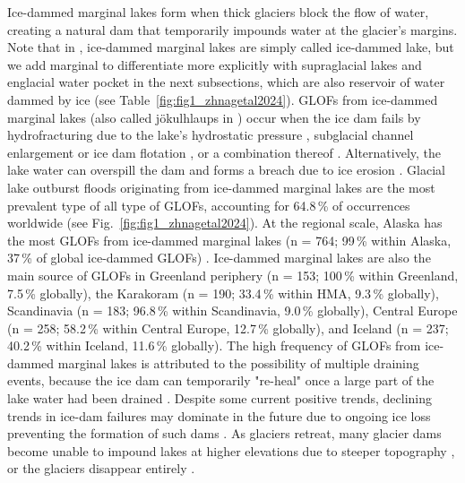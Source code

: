 Ice-dammed marginal lakes form when thick glaciers block the flow of water, creating a natural dam that temporarily impounds water at the glacier's margins. Note that in \cite{Lutzow&al2023,Zhang&al2024}, ice-dammed marginal lakes are simply called ice-dammed lake, but we add marginal to differentiate more explicitly with supraglacial lakes and englacial water pocket in the next subsections, which are also reservoir of water dammed by ice (see Table~\ref{fig:fig1_zhnagetal2024}). GLOFs from ice-dammed marginal lakes (also called jökulhlaups in \cite{Bjornsson2010}) occur when the ice dam fails by hydrofracturing due to the lake's hydrostatic pressure \citep[e.g. in][]{Lindner&al2020}, subglacial channel enlargement \citep{Nye1976} or ice dam flotation \citep[e.g. in][]{Liestol1956}, or a combination thereof \citep{Flowers&al2004}\citep[see also][for a review on the physical aspects of these mechanisms]{Flowers2015}. Alternatively, the lake water can overspill the dam and forms a breach due to ice erosion \citep[e.g.][]{Walder&Costa1996,Raymond&Nolan2000,Mayer&Schuler2005}. Glacial lake outburst floods originating from ice-dammed marginal lakes are the most prevalent type of all type of GLOFs, accounting for 64.8\,\% of occurrences worldwide (see Fig.~\ref{fig:fig1_zhnagetal2024}). At the regional scale, Alaska has the most GLOFs from ice-dammed marginal lakes (n = 764; 99\,\% within Alaska, 37\,\% of global ice-dammed GLOFs) \citep{Emmer&al2022}. Ice-dammed marginal lakes are also the main source of GLOFs in Greenland periphery (n = 153; 100\,\% within Greenland, 7.5\,\% globally), the Karakoram (n = 190; 33.4\,\% within HMA, 9.3\,\% globally), Scandinavia (n = 183; 96.8\,\% within Scandinavia, 9.0\,\% globally), Central Europe (n = 258; 58.2\,\% within Central Europe, 12.7\,\% globally), and Iceland (n = 237; 40.2\,\% within Iceland, 11.6\,\% globally)\citep{Zhang&al2024}. The high frequency of GLOFs from ice-dammed marginal lakes is attributed to the possibility of multiple draining events, because the ice dam can temporarily "re-heal" once a large part of the lake water had been drained \citep{Zhang&al2024}. Despite some current positive trends, declining trends in ice-dam failures may dominate in the future due to ongoing ice loss preventing the formation of such dams \citep{Rick&al2022}. As glaciers retreat, many glacier dams become unable to impound lakes at higher elevations due to steeper topography \cite{Zhang&al2024}, or the glaciers disappear entirely \citep[e.g.][]{Geertsema&Clague2005,Tweed&Russel1999}. %


